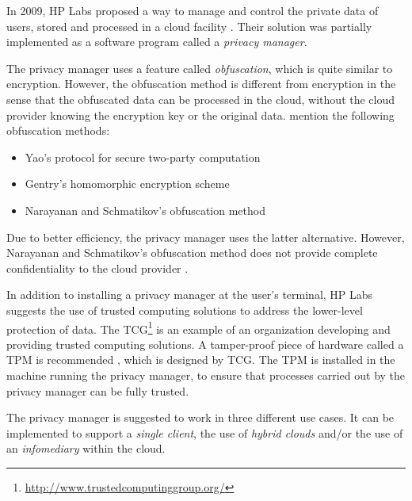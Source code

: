 \documentclass[pdftex,english,10pt,b5paper,twoside]{book}
\begin{document}
In 2009, HP Labs proposed a way to manage and control the private data of users,
stored and processed in a cloud facility \cite{privacymanager}. Their solution
was partially implemented as a software program called a \emph{privacy manager}.

The privacy manager uses a feature called \emph{obfuscation}, which is quite
similar to encryption. However, the obfuscation method is different from
encryption in the sense that the obfuscated data can be processed in the
cloud, without the cloud provider knowing the encryption key or the original
data. \citet{privacymanager} mention the following obfuscation methods:

\begin{itemize}
\item Yao's protocol for secure two-party computation \cite{yao}
\item Gentry's homomorphic encryption scheme \cite{gentry}
\item Narayanan and Schmatikov's obfuscation method \cite{obfuscationmethod}
\end{itemize}

Due to better efficiency, the privacy manager uses the latter alternative. However,
Narayanan and Schmatikov's obfuscation method does not provide complete
confidentiality to the cloud provider \cite{obfuscationmethod}.

In addition to installing a privacy manager at the user's terminal, HP Labs
suggests the use of trusted computing solutions to address the lower-level
protection of data. The
\ac{TCG}\footnote{\url{http://www.trustedcomputinggroup.org/}} is an example of
an organization developing and providing trusted computing solutions. A
tamper-proof piece of hardware called a \ac{TPM} is recommended
\cite{privacymanager}, which is designed by \ac{TCG}. The \ac{TPM} is installed
in the machine running the privacy manager, to ensure that processes carried
out by the privacy manager can be fully trusted.

The privacy manager is suggested to work in three different use cases. It can
be implemented to support a \emph{single client}, the use of \emph{hybrid
clouds} and/or the use of an \emph{infomediary} within the cloud.

\end{document}
